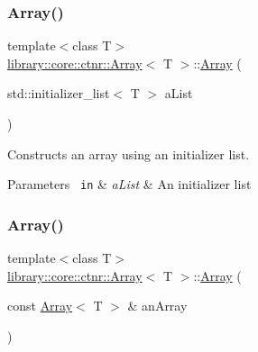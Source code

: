 \mbox{\label{classlibrary_1_1core_1_1ctnr_1_1_array_adcda1d4d28575b580a978406107febbb}} 
\subsubsection{\texorpdfstring{Array()}{Array()}\hspace{0.1cm}{\footnotesize\ttfamily [5/8]}}
{\footnotesize\ttfamily template$<$class T$>$ \\
\mbox{\hyperlink{classlibrary_1_1core_1_1ctnr_1_1_array}{library\+::core\+::ctnr\+::\+Array}}$<$ T $>$\+::\mbox{\hyperlink{classlibrary_1_1core_1_1ctnr_1_1_array}{Array}} (\begin{DoxyParamCaption}\item[{std\+::initializer\+\_\+list$<$ T $>$}]{a\+List }\end{DoxyParamCaption})}



Constructs an array using an initializer list. 


\begin{DoxyCode}{0}
\end{DoxyCode}



\begin{DoxyParams}[1]{Parameters}
\mbox{\texttt{ in}}  & {\em a\+List} & An initializer list \\
\hline
\end{DoxyParams}
\mbox{\label{classlibrary_1_1core_1_1ctnr_1_1_array_a1f218e9e89d4c2cfa84ed8c070894a9d}} 
\subsubsection{\texorpdfstring{Array()}{Array()}\hspace{0.1cm}{\footnotesize\ttfamily [6/8]}}
{\footnotesize\ttfamily template$<$class T$>$ \\
\mbox{\hyperlink{classlibrary_1_1core_1_1ctnr_1_1_array}{library\+::core\+::ctnr\+::\+Array}}$<$ T $>$\+::\mbox{\hyperlink{classlibrary_1_1core_1_1ctnr_1_1_array}{Array}} (\begin{DoxyParamCaption}\item[{const \mbox{\hyperlink{classlibrary_1_1core_1_1ctnr_1_1_array}{Array}}$<$ T $>$ \&}]{an\+Array }\end{DoxyParamCaption})\hspace{0.3cm}{\ttfamily [default]}}



